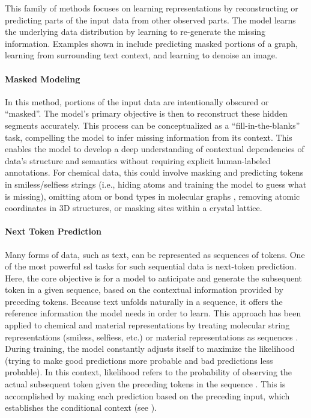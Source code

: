This family of methods focuses on learning representations by reconstructing or predicting parts of the input data from other observed parts. 
The model learns the underlying data distribution by learning to re-generate the missing information. 
Examples shown in  include predicting masked portions of a graph, learning from surrounding text context, and learning to denoise an image.

\label{sec:masked_modeling}
\paragraph{Masked Modeling}  In this method, portions of the input data are intentionally obscured or \enquote{masked}. The model's primary objective is then to reconstruct these hidden segments accurately. \autocite{devlin2018bert0} 
This process can be conceptualized as a \enquote{fill-in-the-blanks} task, compelling the model to infer missing information from its context. This enables the model to develop a deep understanding of contextual dependencies of data's structure and semantics without requiring explicit human-labeled annotations. For chemical data, this could involve masking and predicting tokens in \glspl{smiles}/\glspl{selfies} strings \autocite{chithrananda2020chemberta, zhang2025scientific} (i.e., hiding atoms and training the model to guess what is missing), omitting atom or bond types in molecular graphs \autocite{mahmood2021masked,wang2022molecular, reiser2022graph}, removing atomic coordinates in 3D structures, or masking sites within a crystal lattice.



\paragraph{Next Token Prediction} 
\label{sec:next_token_prediction}
Many forms of data, such as text, can be represented as sequences of tokens. 
One of the most powerful \gls{ssl} tasks for such sequential data is next-token prediction.
Here, the core objective is for a model to anticipate and generate the subsequent token in a given sequence, based on the contextual information provided by preceding tokens. 
Because text unfolds naturally in a sequence, it offers the reference information the model needs in order to learn. This approach has been applied to chemical and material representations by treating molecular string representations (\glspl{smiles}, \glspl{selfies}, etc.) or material representations as sequences \autocite{adilov2021generative, wang2023cmolgpt, schwaller2019molecular, alampara2024mattext}. 
During training, the model constantly adjusts itself to maximize the likelihood (trying to make good predictions more probable and bad predictions less probable). In this context, likelihood refers to the probability of observing the actual subsequent token given the preceding tokens in the sequence . This is accomplished by making each prediction based on the preceding input, which establishes the conditional context (see ).


